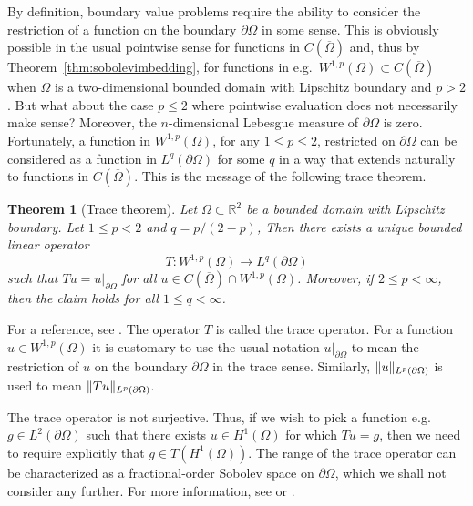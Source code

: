 \documentclass[english, 12pt, a4paper, sci, utf8, a-2b, online]{aaltothesis}
\theoremstyle{definition}
\theoremstyle{plain}
\newtheorem{theorem}{Theorem}[section]
\DeclarePairedDelimiter\norm{\lVert}{\rVert}
\numberwithin{equation}{section}
\begin{document}
By definition, boundary value problems require the ability to consider
the restriction of a function on the boundary $\partial \Omega$ in some sense.
This is obviously possible in the usual pointwise sense
for functions in $C(\overline{\Omega})$
and, thus by Theorem~\ref{thm:sobolevimbedding}, for functions
in e.g.\ $W^{1,p}(\Omega) \subset C(\overline{\Omega})$
when $\Omega$ is a two-dimensional bounded domain with Lipschitz boundary
and $p > 2$. But what about the case $p \leq 2$ where pointwise
evaluation does not necessarily make sense? Moreover,
the $n$-dimensional Lebesgue measure of $\partial \Omega$ is zero.
Fortunately, a function in $W^{1,p}(\Omega)$, for any $1 \leq p \leq 2$,
restricted on $\partial \Omega$
can be considered as a function in $L^q(\partial \Omega)$ for some $q$
in a way that extends naturally to functions in $C(\overline{\Omega})$.
This is the message of the following trace theorem.
\begin{theorem}[Trace theorem]
    \label{thm:tracetheorem}
    Let $\Omega \subset \mathbb{R}^2$ be a bounded domain with Lipschitz boundary.
    Let $1 \leq p < 2$ and $q = p/(2-p)$,
    Then there exists a unique bounded linear operator
    \begin{equation*}
        T: W^{1,p}(\Omega) \to L^q(\partial \Omega)   
    \end{equation*}
    such that $Tu = u|_{\partial \Omega}$ for all
    $u \in C(\overline{\Omega}) \cap W^{1,p}(\Omega)$.
    Moreover, if $2 \leq p < \infty$,
    then the claim holds for all $1 \leq q < \infty$.
\end{theorem}
For a reference,
see \cite[Theorem 4.2 on p.\ 79 and Theorem 4.6 on p.\ 81]{necas2011}.
The operator $T$ is called the trace operator.
For a function $u \in W^{1,p}(\Omega)$ it is customary to use the usual
notation $u|_{\partial \Omega}$ to mean the restriction of $u$ on the
boundary $\partial \Omega$ in the trace sense.
Similarly, $\norm{u}_{L^p(\partial \Omega)}$ is used to mean
$\norm{Tu}_{L^p(\partial \Omega)}$.

The trace operator is not surjective.
Thus, if we wish to pick a function e.g.\ $g \in L^2(\partial \Omega)$
such that there exists $u \in H^1(\Omega)$ for which
$Tu = g$, then we need to require explicitly that $g \in T(H^1(\Omega))$.
The range of the trace operator can be characterized as a fractional-order
Sobolev space on $\partial \Omega$, which we shall not consider
any further. For more information, see \cite{adams2003}
or \cite{lions1972}.
\end{document}
